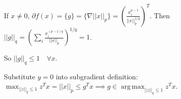 \documentclass[12pt,letterpaper]{article}
\DeclareMathOperator*{\argmax}{arg\,max}
\begin{document}
\begin{alphalist}
\begin{enumerate}[label=(\roman*)]
        If $x \ne 0$, $\partial{}f(x) = \{g\} = \{\nabla{}||x||_p\} = \left(
        \frac{x_i^{p-1}}{||x||_p^{1/q}} \right)^T$. Then $||g||_q =
        \left( \sum_i\frac{x_i^{(p-1)q}}{||x||_p} \right)^{1/q} = 1$.


        So $||g||_q \le 1 \quad \forall x$.


        Substitute $y = 0$ into subgradient definition: $\max_{||z||_q
        \le 1} z^Tx = ||x||_p \le g^Tx \implies g \in \argmax_{||z||_q \le 1}
        z^Tx$.

\end{enumerate}
\end{alphalist}

\end{document}
